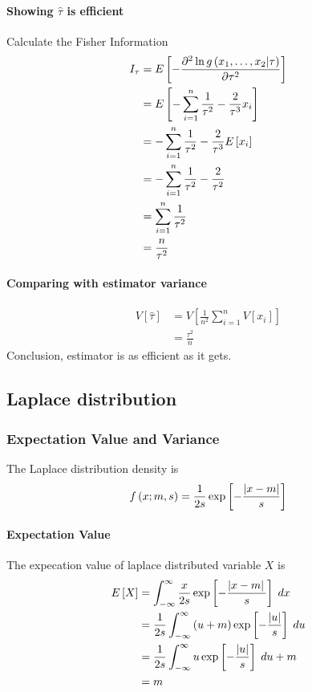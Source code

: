 \paragraph{Showing $\hat{\tau}$ is efficient}
Calculate the Fisher Information
\begin{align}
    I_\tau &= E\left[-\pdv[2]{\ln g\left(x_1,\dots,x_2\vert \tau\right)}{\tau}\right]
    \\&=E\left[-\sum_{i=1}^n \frac{1}{\tau^2}-\frac{2}{\tau^3}x_i\right]
    \\&=-\sum_{i=1}^n \frac{1}{\tau^2}-\frac{2}{\tau^3}E\left[x_i\right]
    \\&=-\sum_{i=1}^n \frac{1}{\tau^2}-\frac{2}{\tau^2}
    \\&=\sum_{i=1}^n \frac{1}{\tau^2}
    \\&=\frac{n}{\tau^2}
\end{align}
\paragraph{Comparing with estimator variance}
\begin{align}
    V\left[\hat{\tau}\right] &= V\left[\frac{1}{n^2}\sum_{i=1}^n V\left[x_i\right]\right]
    \\&=\frac{\tau^2}{n}
\end{align}
Conclusion, estimator is as efficient as it gets.
\subsection{Laplace distribution}
\subsubsection{Expectation Value and Variance}
The Laplace distribution density is
\begin{align}
    f\left(x;m,s\right)=\frac{1}{2s}\exp\left[-\frac{\abs{x-m}}{s}\right]
\end{align}
\paragraph{Expectation Value}
The expecation value of laplace distributed variable $X$ is
\begin{align}
    E\left[X\right]&=\int_{-\infty}^{\infty}\frac{x}{2s}\exp\left[-\frac{\abs*{x-m}}{s}\right]\;dx
    \\&=\frac{1}{2s}\int_{-\infty}^\infty \left(u+m\right)\exp\left[-\frac{\abs{u}}{s}\right]\;du
    \\&=\frac{1}{2s}\int_{-\infty}^\infty u\exp\left[-\frac{\abs{u}}{s}\right]\;du+m
    \\&=m
\end{align}
